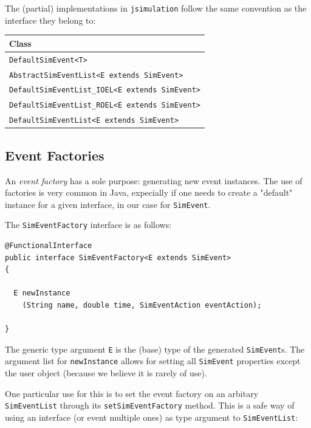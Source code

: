\documentclass[12pt]{book}
\begin{document}
The (partial) implementations in \lstinline|jsimulation| follow the same convention
  as the interface they belong to:

\begin{tabular}{|l|}
  \hline
  {\bf Class} \\
  \hline
  \lstinline|DefaultSimEvent<T>| \\
  \hline
  \lstinline|AbstractSimEventList<E extends SimEvent>| \\
  \hline
  \lstinline|DefaultSimEventList_IOEL<E extends SimEvent>| \\
  \hline
  \lstinline|DefaultSimEventList_ROEL<E extends SimEvent>| \\
  \hline
  \lstinline|DefaultSimEventList<E extends SimEvent>| \\
  \hline
\end{tabular}

\subsection{Event Factories}

An {\em event factory\/} has a sole purpose: generating new event instances.
The use of factories is very common in Java,
  expecially if one needs to create a "default"
  instance for a given interface,
  in our case for \lstinline-SimEvent-.

The \lstinline|SimEventFactory| interface is as follows:

\begin{lstlisting}[basicstyle=\footnotesize]
@FunctionalInterface
public interface SimEventFactory<E extends SimEvent>
{
  
  E newInstance
    (String name, double time, SimEventAction eventAction);

}
\end{lstlisting}

The generic type argument \lstinline|E| is the (base) type
  of the generated \lstinline|SimEvent|s.
The argument list for \lstinline|newInstance| allows
  for setting all \lstinline|SimEvent| properties except the user object
  (because we believe it is rarely of use).

One particular use for this is to set the event factory
  on an arbitary \lstinline|SimEventList|
  through its \lstinline|setSimEventFactory| method.
This is a safe way of using an interface (or event multiple ones)
  as type argument to \lstinline|SimEventList|:
\end{document}
